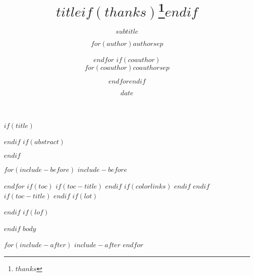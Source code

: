 \documentclass[a4paper,11pt]{article}
\title{\textbf{$title$}$if(thanks)$\thanks{$thanks$}$endif$}
\subtitle{$subtitle$}
\author{$for(author)$$author$$sep$ \and $endfor$
$if(coauthor)$ \\ $for(coauthor)$$coauthor$$sep$ \and $endfor$$endif$}
\date{$date$}
\institute{$for(institute)$$institute$$sep$ \and $endfor$}
\begin{document}
$if(title)$
\maketitle
$endif$
$if(abstract)$
\begin{abstract}

\end{abstract}
$endif$

$for(include-before)$
$include-before$

$endfor$
$if(toc)$
$if(toc-title)$
\renewcommand*\contentsname{$toc-title$}
$endif$
{
$if(colorlinks)$
\hypersetup{linkcolor=$if(toccolor)$$toccolor$$else$$endif$}
$endif$
\tableofcontents
}
$endif$
$if(toc-title)$
\renewcommand*\contentsname{$toc-title$}
$endif$
$if(lot)$
\listoftables
$endif$
$if(lof)$
\listoffigures
$endif$
$body$

% 



$for(include-after)$
$include-after$
$endfor$
\end{document}
